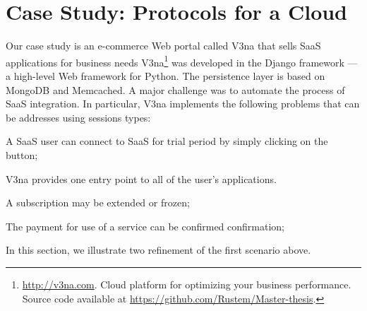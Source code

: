 \documentclass[10pt]{llncs}
\begin{document}

\section{Case Study: Protocols for a Cloud}
\label{sect:impl}

Our case study is an e-commerce Web portal called V3na that sells SaaS applications for business needs
V3na\footnote{\url{http://v3na.com}. Cloud platform for optimizing your business performance. Source code available at \url{https://github.com/Rustem/Master-thesis}.}
was developed
in the Django framework --- a high-level Web framework for Python. %
The persistence layer is based on MongoDB and Memcached.
A major challenge was to automate the process of SaaS integration.
In particular, V3na implements the following problems that can be addresses using sessions types:
%
\begin{compactitem}
\item  A SaaS user can connect to SaaS for trial period by simply clicking on the button;

\item  V3na provides one entry point to all of the user's applications.

\item  A subscription may be extended or frozen;

\item  The payment for use of a service can be confirmed confirmation;
\end{compactitem}
In this section, we illustrate two refinement of the first scenario above.
\end{document}
